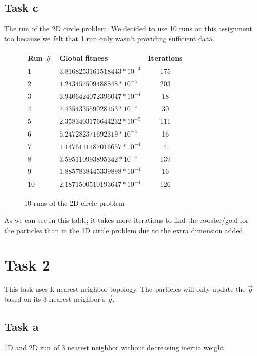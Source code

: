 \documentclass[12pt, a4paper]{article}
\begin{document}
\subsection{Task c}
The run of the 2D circle problem. We decided to use 10 runs on this assignment too because we felt that 1 run only wasn't providing sufficient data.
\begin{figure}[H]
\begin{center}
\begin{tabular}{l| l  c}
Run \# & Global fitness& Iterations\\ \hline
1&$3.8168253161518443*10^{-4}$ & 175\\ 
2&$4.243457509488848*10^{-4}$ & 203\\
3&$3.9406424072396047*10^{-4}$ & 18\\ 
4&$7.435433559028153*10^{-4}$ & 30\\
5&$2.3583403176644232*10^{-5}$ & 111\\ 
6&$5.247282371692319*10^{-4}$ & 16\\ 
7&$1.1476111187016657*10^{-4}$ & 4\\ 
8&$3.595110993895342*10^{-4}$ & 139\\
9&$1.8857838445339898*10^{-4}$ & 16\\ 
10&$2.1871500510193647*10^{-4}$ & 126\\ 
\end{tabular}
\caption{10 runs of the 2D circle problem}
\end{center}
\end{figure}
As we can see in this table; it takes more iterations to find the rooster/goal for the particles than in the 1D circle problem due to the extra dimension added.

\section{Task 2}
This task uses k-nearest neighbor topology. The particles will only update the $\vec{g}$ based on its 3 nearest neighbor's $\vec{g}$. 
\subsection{Task a}
1D and 2D run of 3 nearest neighbor without decreasing inertia weight.
\end{document}
